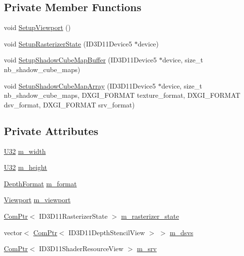 \subsection*{Private Member Functions}
\begin{DoxyCompactItemize}
\item 
void \hyperlink{structmage_1_1_shadow_cube_map_buffer_a612f25e151e575a7266b41ddb6a072cf}{Setup\+Viewport} ()
\item 
void \hyperlink{structmage_1_1_shadow_cube_map_buffer_a2bee1ede60f16cc3b9cfc9ee72a8dec9}{Setup\+Rasterizer\+State} (I\+D3\+D11\+Device5 $\ast$device)
\item 
void \hyperlink{structmage_1_1_shadow_cube_map_buffer_a0ac976b6d2a8730bce826fa7ffa502db}{Setup\+Shadow\+Cube\+Map\+Buffer} (I\+D3\+D11\+Device5 $\ast$device, size\+\_\+t nb\+\_\+shadow\+\_\+cube\+\_\+maps)
\item 
void \hyperlink{structmage_1_1_shadow_cube_map_buffer_af2fcb67943e27ee60c71524993493109}{Setup\+Shadow\+Cube\+Map\+Array} (I\+D3\+D11\+Device5 $\ast$device, size\+\_\+t nb\+\_\+shadow\+\_\+cube\+\_\+maps, D\+X\+G\+I\+\_\+\+F\+O\+R\+M\+AT texture\+\_\+format, D\+X\+G\+I\+\_\+\+F\+O\+R\+M\+AT dsv\+\_\+format, D\+X\+G\+I\+\_\+\+F\+O\+R\+M\+AT srv\+\_\+format)
\end{DoxyCompactItemize}
\subsection*{Private Attributes}
\begin{DoxyCompactItemize}
\item 
\hyperlink{namespacemage_a41c104c036fba3756a74e19f793eeaa1}{U32} \hyperlink{structmage_1_1_shadow_cube_map_buffer_a9492f3ff2146a03d30f3f02fd7985aba}{m\+\_\+width}
\item 
\hyperlink{namespacemage_a41c104c036fba3756a74e19f793eeaa1}{U32} \hyperlink{structmage_1_1_shadow_cube_map_buffer_ac20a53ecc1ec9a00a2241f8c8a3405e6}{m\+\_\+height}
\item 
\hyperlink{namespacemage_aed4c3f883a30484d0a20762c06be81d4}{Depth\+Format} \hyperlink{structmage_1_1_shadow_cube_map_buffer_ada9a7c895a74303904f9884b986c935f}{m\+\_\+format}
\item 
\hyperlink{classmage_1_1_viewport}{Viewport} \hyperlink{structmage_1_1_shadow_cube_map_buffer_aac92648e1af47ffdf99575cdaab0485e}{m\+\_\+viewport}
\item 
\hyperlink{namespacemage_ae74f374780900893caa5555d1031fd79}{Com\+Ptr}$<$ I\+D3\+D11\+Rasterizer\+State $>$ \hyperlink{structmage_1_1_shadow_cube_map_buffer_a72ffa7fc89386a954b33fac38a894f2c}{m\+\_\+rasterizer\+\_\+state}
\item 
vector$<$ \hyperlink{namespacemage_ae74f374780900893caa5555d1031fd79}{Com\+Ptr}$<$ I\+D3\+D11\+Depth\+Stencil\+View $>$ $>$ \hyperlink{structmage_1_1_shadow_cube_map_buffer_aa0db6bec24d63c39c85400c4328190fc}{m\+\_\+dsvs}
\item 
\hyperlink{namespacemage_ae74f374780900893caa5555d1031fd79}{Com\+Ptr}$<$ I\+D3\+D11\+Shader\+Resource\+View $>$ \hyperlink{structmage_1_1_shadow_cube_map_buffer_a16738a534aca6de39aec687bc79ede1c}{m\+\_\+srv}
\end{DoxyCompactItemize}


